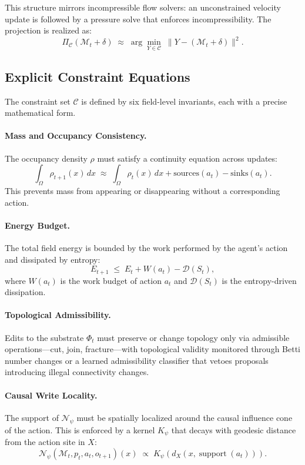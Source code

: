 \documentclass[11pt]{article}
\begin{document}
This structure mirrors incompressible flow solvers: an unconstrained
velocity update is followed by a pressure solve that enforces
incompressibility.
The projection is realized as:
\[
\Pi_{\mathcal{C}}(\mathcal{M}_t + \delta)
\;\approx\;
\arg\min_{Y \in \mathcal{C}}\;
\|Y - (\mathcal{M}_t + \delta)\|^2.
\]

\subsection{Explicit Constraint Equations}

The constraint set $\mathcal{C}$ is defined by six field-level invariants,
each with a precise mathematical form.

\paragraph{Mass and Occupancy Consistency.}
The occupancy density $\rho$ must satisfy a continuity equation across
updates:
\[
\int_\Omega \rho_{t+1}(x)\, dx
\;\approx\;
\int_\Omega \rho_t(x)\, dx
+ \text{sources}(a_t)
- \text{sinks}(a_t).
\]
This prevents mass from appearing or disappearing without a corresponding
action.

\paragraph{Energy Budget.}
The total field energy is bounded by the work performed by the agent's
action and dissipated by entropy:
\[
E_{t+1} \;\le\; E_t + W(a_t) - \mathcal{D}(S_t),
\]
where $W(a_t)$ is the work budget of action $a_t$ and $\mathcal{D}(S_t)$
is the entropy-driven dissipation.

\paragraph{Topological Admissibility.}
Edits to the substrate $\Phi_t$ must preserve or change topology only via
admissible operations---cut, join, fracture---with topological validity
monitored through Betti number changes or a learned admissibility
classifier that vetoes proposals introducing illegal connectivity changes.

\paragraph{Causal Write Locality.}
The support of $\mathcal{N}_\psi$ must be spatially localized around the
causal influence cone of the action.
This is enforced by a kernel $K_\psi$ that decays with geodesic distance
from the action site in $X$:
\[
\mathcal{N}_\psi(\mathcal{M}_t, p_t, a_t, o_{t+1})(x)
\;\propto\;
K_\psi\!\left(d_X(x, \operatorname{support}(a_t))\right).
\]
\end{document}
